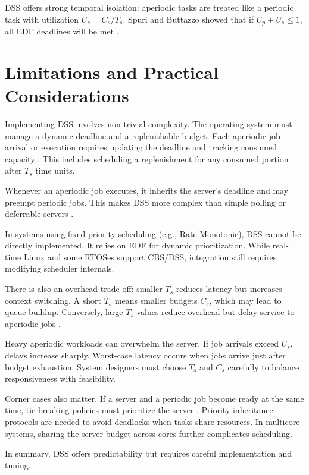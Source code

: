 \documentclass[conference]{IEEEtran}
\begin{document}
DSS offers strong temporal isolation: aperiodic tasks are treated like a periodic task with utilization $U_s = C_s / T_s$. Spuri and Buttazzo showed that if $U_p + U_s \leq 1$, all EDF deadlines will be met \cite{spuri1994efficient, buttazzo2011hard}.

\section{Limitations and Practical Considerations}

Implementing DSS involves non-trivial complexity. The operating system must manage a dynamic deadline and a replenishable budget. Each aperiodic job arrival or execution requires updating the deadline and tracking consumed capacity \cite{cpen432}. This includes scheduling a replenishment for any consumed portion after $T_s$ time units.

Whenever an aperiodic job executes, it inherits the server’s deadline and may preempt periodic jobs. This makes DSS more complex than simple polling or deferrable servers \cite{cpen432, queensu2023dss}.

In systems using fixed-priority scheduling (e.g., Rate Monotonic), DSS cannot be directly implemented. It relies on EDF for dynamic prioritization. While real-time Linux and some RTOSes support CBS/DSS, integration still requires modifying scheduler internals.

There is also an overhead trade-off: smaller $T_s$ reduces latency but increases context switching. A short $T_s$ means smaller budgets $C_s$, which may lead to queue buildup. Conversely, large $T_s$ values reduce overhead but delay service to aperiodic jobs \cite{queensu2023dss}.

Heavy aperiodic workloads can overwhelm the server. If job arrivals exceed $U_s$, delays increase sharply. Worst-case latency occurs when jobs arrive just after budget exhaustion. System designers must choose $T_s$ and $C_s$ carefully to balance responsiveness with feasibility.

Corner cases also matter. If a server and a periodic job become ready at the same time, tie-breaking policies must prioritize the server \cite{cpen432}. Priority inheritance protocols are needed to avoid deadlocks when tasks share resources. In multicore systems, sharing the server budget across cores further complicates scheduling.

In summary, DSS offers predictability but requires careful implementation and tuning.
\end{document}
